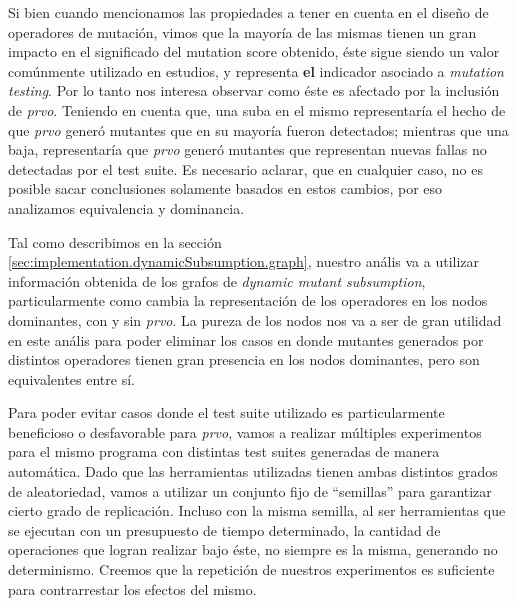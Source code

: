 Si bien cuando mencionamos las propiedades a tener en cuenta en el dise\~no de operadores de mutaci\'on, vimos que la mayor\'ia de las mismas tienen un gran impacto en el significado del mutation score obtenido, \'este sigue siendo un valor com\'unmente utilizado en estudios, y representa \textbf{el} indicador asociado a \emph{mutation testing}. Por lo tanto nos interesa observar como \'este es afectado por la inclusi\'on de \emph{prvo}. Teniendo en cuenta que, una suba en el mismo representar\'ia el hecho de que \emph{prvo} gener\'o mutantes que en su mayor\'ia fueron detectados; mientras que una baja, representar\'ia que \emph{prvo} gener\'o mutantes que representan nuevas fallas no detectadas por el test suite. Es necesario aclarar, que en cualquier caso, no es posible sacar conclusiones solamente basados en estos cambios, por eso analizamos equivalencia y dominancia.

Tal como describimos en la secci\'on \ref{sec:implementation.dynamicSubsumption.graph}, nuestro an\'alis va a utilizar informaci\'on obtenida de los grafos de \emph{dynamic mutant subsumption}, particularmente como cambia la representaci\'on de los operadores en los nodos dominantes, con y sin \emph{prvo}. La pureza de los nodos nos va a ser de gran utilidad en este an\'alis para poder eliminar los casos en donde mutantes generados por distintos operadores tienen gran presencia en los nodos dominantes, pero son equivalentes entre s\'i.

Para poder evitar casos donde el test suite utilizado es particularmente beneficioso o desfavorable para \emph{prvo}, vamos a realizar m\'ultiples experimentos para el mismo programa con distintas test suites generadas de manera autom\'atica. Dado que las herramientas utilizadas tienen ambas distintos grados de aleatoriedad, vamos a utilizar un conjunto fijo de ``semillas'' para garantizar cierto grado de replicaci\'on. Incluso con la misma semilla, al ser herramientas que se ejecutan con un presupuesto de tiempo determinado, la cantidad de operaciones que logran realizar bajo \'este, no siempre es la misma, generando no determinismo. Creemos que la repetici\'on de nuestros experimentos es suficiente para contrarrestar los efectos del mismo.

